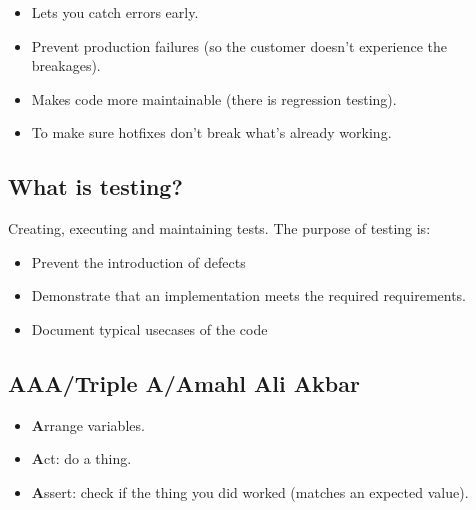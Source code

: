 \begin{itemize}
    \item Lets you catch errors early.
    \item Prevent production failures (so the customer doesn't experience the breakages).
    \item Makes code more maintainable (there is regression testing).
    \item To make sure hotfixes don't break what's already working.
\end{itemize}

\subsection{What is testing?}\label{sub:what_is_testing_}

Creating, executing and maintaining tests.
The purpose of testing is:
\begin{itemize}
    \item Prevent the introduction of defects
    \item Demonstrate that an implementation meets the required requirements.
    \item Document typical usecases of the code
\end{itemize}

\subsection{AAA/Triple A/Amahl Ali Akbar}\label{sub:aaa_triple_a_amahl_ali_akbar}

\begin{itemize}
    \item \textbf{A}rrange variables.
    \item \textbf{A}ct: do a thing.
    \item \textbf{A}ssert: check if the thing you did worked (matches an expected value).
\end{itemize}
